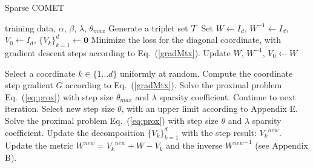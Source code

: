 \documentclass[twoside,11pt]{article}
\newcommand\mat[1]{{#1}}
\renewcommand\vec[1]{\mathbf{#1}}
\newcommand{\W}{\mat{W}}
\newcommand{\newW}{{\mat{W^{new}}}}
\newcommand{\tL}{\tilde{L}(\W)}
\newcommand{\ignore}[1]{}
\newcommand{\q}{{\vec{q}}}
\newcommand{\trip}{{t}}
\newcommand{\qt}{{\q_{\trip}}}
\newcommand{\Vk}{\mat{V_k}}
\newcommand{\Vz}{\mat{V_0}}
\newcommand{\Vgrc}{\{\Vk\}_{k=1}^{d}} %
\newcommand{\cholL}{\mat{L}}
\renewcommand{\eqref}[1]{Eq.~(\ref{#1})}
\begin{document}
\ignore{The objective $L(\W)$ in \eqref{eq-logdet-loss} is strongly convex but is not smooth, since the gradient of the $\log \det$ term is unbounded near the envelope of the PD cone. Let $\tilde{L}({\W}) = L({\W + \kappa I_d})$ be a modified version of the loss in Eq. \ref{eq-logdet-loss}, where $I_d$ is the $d \times d$ identity matrix, and $\kappa>0$ is a fixed parameter.
We prove the following Theorem (see Appendix D):
\begin{theorem}
Let $\W^t$ be the $t$-th iterate of Algorithm \ref{alg:comet} with objective function $\tL$, sampling each column-row $i$ with probability $\frac{1}{d}$, and step size $\eta$ which is smaller than $1/\left( 2 \sum_{t=1}^T (\qt_i^2 +{\Delta\vec{p}_{t}}_i^2) + \frac{\alpha d}{\kappa^2} + \beta\right)$. Let $\tilde{L}^*$ be the optimal value of $\tL$ on the PD cone. Let $\beta^* \geq \beta$ be the strong convexity parameter of $\tL$, $M^1$ a constant depending on the norm of the dataset, $1 > \rho >0, \epsilon>0$. Then:

If $t > \frac{ (M^1 + \alpha d (1/\kappa)^2 + \beta)}{d\beta^*} log \left( \frac{\tilde{L}(W^0) - \tilde{L}^*}{\epsilon \rho}\right)$ then $Prob(\tilde{L}(\W^t) - \tilde{L}^* \leq \epsilon) \geq 1-\rho$.
\end{theorem}}

\begin{algorithm}[t]
   \caption{Sparse COMET}
   \label{alg:spcomet}
\begin{algorithmic}[1]
    training data, $\alpha$, $\beta$, $\lambda$, $\theta_{max}$
   \STATE Generate a triplet set $\cal{T}$
   \STATE Set  $\W  \leftarrow I_d$, $\W^{-1}  \leftarrow I_d$, $\Vz   \leftarrow I_d$, $\Vgrc \leftarrow \vec{0}$
   \STATE Minimize the loss for the diagonal coordinate, with gradient descent steps according to  \eqref{gradMtx}.
   \STATE Update $\W$, $\W^{-1}$, $\Vz \leftarrow \W$
    
   \REPEAT 
   \STATE Select a coordinate $k \in \{1 \ldots d\}$ uniformly at random.
   \STATE Compute the coordinate step gradient $\mat{G}$ according to \eqref{gradMtx}.
   \STATE Solve the proximal problem \eqref{eq:prox} with step size $\theta_{max}$ and $\lambda$ sparsity coefficient.
     \STATE Continue to next iteration.
   \ELSE 
      \STATE Select new step size $\theta$, with an upper limit according to Appendix E.
       \STATE Solve the proximal problem \eqref{eq:prox} with step size $\theta$ and $\lambda$ sparsity coefficient.
      \STATE Update the decomposition $\Vgrc$ with the step result: $\Vk^{new}$.
      \STATE Update the metric $\newW = \Vk^{new} + \W - \Vk$ and the inverse $\newW^{-1}$ (see Appendix B).
    \ENDIF
\end{algorithmic}
\vskip -5pt
\end{algorithm}
\end{document}
